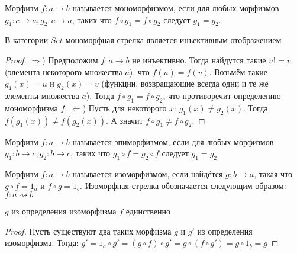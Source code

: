 


\begin{defn}
  Морфизм $f \colon a \to b$ называется мономорфизмом, если для любых морфизмов
  $g_1 \colon c \to a, g_2 \colon c \to a$, таких что $f \circ g_1 = f \circ g_2$
  следует $g_1 = g_2$.
\end{defn}

\begin{thm}
  В категории $Set$ мономорфная стрелка является инъективным отображением
\end{thm}
\begin{proof}
  $\Rightarrow$) Предположим $f \colon a \to b$ не инъективно. Тогда найдутся такие $u != v$
  (элемента некоторого множества $a$), что $f(u) = f(v)$. Возьмём такие
  $g_1(x) = u$ и $g_2(x) = v$ (функции, возвращающие всегда одни и те же
  элементы множества $a$). Тогда $f \circ g_1 = f \circ g_2$, что противоречит
  определению мономорфизма $f$.
  $\Leftarrow$) Пусть для некоторого $x$: $g_1(x) \ne g_2(x)$. Тогда $f(g_1(x))
  \ne f(g_2(x))$. А значит $f \circ g_1 \ne f \circ g_2$.
\end{proof}

\begin{defn}
  Морфизм $f \colon a \to b$ называется эпиморфизмом, если для любых морфизмов
  $g_1 \colon b \to c, g_2 \colon b \to c$, таких что $g_1 \circ f = g_2 \circ f$
  следует $g_1 = g_2$
\end{defn}

\begin{defn}
  Морфизм $f \colon a \to b$ называется изоморфизмом, если найдётся
  $g \colon b \to a$, такая что $g \circ f = 1_a$ и $f \circ g = 1_b$.
  Изоморфная стрелка обозначается следующим образом:
  $f \colon a \rightsquigarrow b$
\end{defn}

\begin{stmt}
  $g$ из определения изоморфизма $f$ единственно
\end{stmt}
\begin{proof}
  Пусть существуют два таких морфизма $g$ и $g'$ из определения изоморфизма. Тогда:
  $g' = 1_a \circ g' = (g \circ f) \circ g' = g \circ (f \circ g') = g \circ 1_b = g$
\end{proof}

